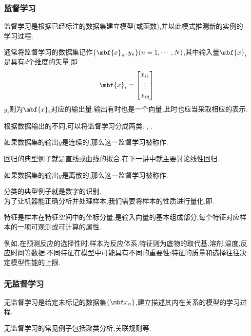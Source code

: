 \documentclass{ctexart}
\begin{document}
\subsubsection{监督学习}
\begin{definition}[监督学习]
    监督学习是根据已经标注的数据集建立模型(或函数),并以此模式推测新的实例的学习过程.
\end{definition}
\begin{notation}[数据集]
    通常将监督学习的数据集记作$\{\mbf{x}_n,y_n\}(n=1,\cdots,N)$,其中输入量$\mbf{x}_i$是具有$d$个维度的矢量,即
    \[\mbf{x}_i=\begin{bmatrix}
        x_{i1}\\\vdots\\x_{id}
    \end{bmatrix}\]
    $y_i$则为$\mbf{x}_i$对应的输出量.输出有时也是一个向量,此时也应当采取相应的表示.
\end{notation}
根据数据输出的不同,可以将监督学习分成两类: , .
\begin{definition}[回归]
    如果数据集的输出$y$是连续的,那么这一监督学习被称作.
\end{definition}
回归的典型例子就是直线或曲线的拟合.在下一讲中就主要讨论线性回归.
\begin{definition}[分类]
    如果数据集的输出$y$是离散的,那么这一监督学习被称作.
\end{definition}
分类的典型例子就是数字的识别.\\
\indent 为了让机器能正确分析并处理样本,我们需要将样本的性质进行量化,即.
\begin{definition}[特征]
    特征是样本在特征空间中的坐标分量,是输入向量的基本组成部分,每个特征对应样本的一项可观测或可计算的属性.
\end{definition}
例如,在预测反应的选择性时,样本为反应体系,特征则为底物的取代基,溶剂,温度,反应时间等数据.不同特征在模型中可能具有不同的重要性;特征的质量和选择往往决定模型性能的上限.
\subsubsection{无监督学习}
\begin{definition}[无监督学习]
    无监督学习是给定未标记的数据集$\{\mbf x_n\}$,建立描述其内在关系的模型的学习过程.
\end{definition}
无监督学习的常见例子包括聚类分析,关联规则等.
\end{document}
